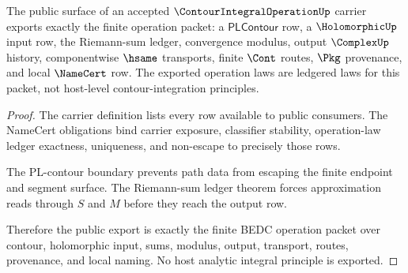 \begin{theorem}
\label{thm:contour-integral-public-export}
The public surface of an accepted $\ContourIntegralOperationUp$ carrier exports exactly the finite operation packet: a $\mathsf{PLContour}$ row, a $\HolomorphicUp$ input row, the Riemann-sum ledger, convergence modulus, output $\ComplexUp$ history, componentwise $\hsame$ transports, finite $\Cont$ routes, $\Pkg$ provenance, and local $\NameCert$ row. The exported operation laws are ledgered laws for this packet, not host-level contour-integration principles.
\end{theorem}
\begin{proof}
The carrier definition lists every row available to public consumers. The NameCert obligations bind carrier exposure, classifier stability, operation-law ledger exactness, uniqueness, and non-escape to precisely those rows.

The PL-contour boundary prevents path data from escaping the finite endpoint and segment surface. The Riemann-sum ledger theorem forces approximation reads through $S$ and $M$ before they reach the output row.

Therefore the public export is exactly the finite BEDC operation packet over contour, holomorphic input, sums, modulus, output, transport, routes, provenance, and local naming. No host analytic integral principle is exported.
\end{proof}

